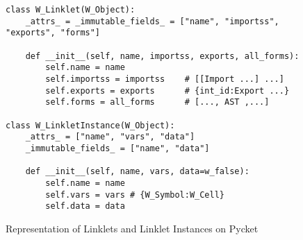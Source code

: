 \begin{figure}[!htbp]
  \centering
  \begin{minipage}{0.7\textwidth}
\begin{lstlisting}[style=python-style,numbers=none]
class W_Linklet(W_Object):
    _attrs_ = _immutable_fields_ = ["name", "importss", "exports", "forms"]

    def __init__(self, name, importss, exports, all_forms):
        self.name = name
        self.importss = importss    # [[Import ...] ...]
        self.exports = exports      # {int_id:Export ...}
        self.forms = all_forms      # [..., AST ,...]

class W_LinkletInstance(W_Object):
    _attrs_ = ["name", "vars", "data"]
    _immutable_fields_ = ["name", "data"]

    def __init__(self, name, vars, data=w_false):
        self.name = name
        self.vars = vars # {W_Symbol:W_Cell}
        self.data = data
\end{lstlisting}
  \end{minipage}
  \caption{Representation of Linklets and Linklet Instances on Pycket}
  \label{fig:pycket-linklet-representation}
\end{figure}
